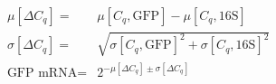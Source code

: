 \documentclass{article}
\begin{document}
\begin{gather*}
\mu[\Delta C_q] = & \mu[C_q,\textrm{GFP}] - \mu[C_q,\textrm{16S}]
\\
\sigma[\Delta C_q] = & \sqrt{
  \sigma[C_q,\textrm{GFP}]^2 +
  \sigma[C_q,\textrm{16S}]^2 }
\\
\textrm{GFP mRNA} = & 2^{- \mu[\Delta C_q] \pm \sigma[\Delta C_q]}
\end{gather*}
\end{document}
